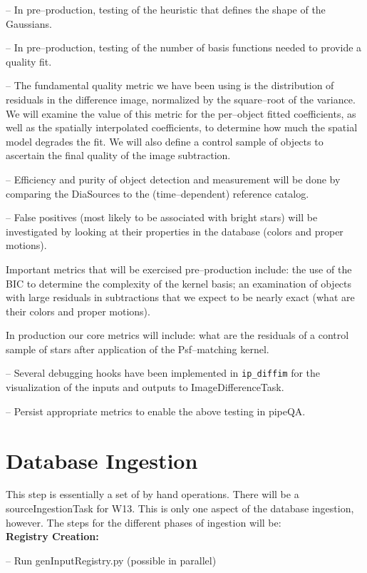 \documentclass[12pt]{article}
\begin{document}
-- In pre--production, testing of the heuristic that defines the shape
of the Gaussians.

-- In pre--production, testing of the number of basis functions needed
to provide a quality fit.  

-- The fundamental quality metric we have been using is the
distribution of residuals in the difference image, normalized by the
square--root of the variance.  We will examine the value of this
metric for the per--object fitted coefficients, as well as the
spatially interpolated coefficients, to determine how much the spatial
model degrades the fit.  We will also define a control sample of
objects to ascertain the final quality of the image subtraction.

-- Efficiency and purity of object detection and measurement will be
done by comparing the DiaSources to the (time--dependent) reference
catalog.

-- False positives (most likely to be associated with bright stars)
will be investigated by looking at their properties in the database
(colors and proper motions).

Important metrics that will be exercised pre--production include: the
use of the BIC to determine the complexity of the kernel basis; an
examination of objects with large residuals in subtractions that we
expect to be nearly exact (what are their colors and proper motions).

In production our core metrics will include: what are the residuals of
a control sample of stars after application of the Psf--matching
kernel.

-- Several debugging hooks have been implemented in {\tt ip\_diffim} for
the visualization of the inputs and outputs to ImageDifferenceTask.

-- Persist appropriate metrics to enable the above testing in pipeQA.


\clearpage 
\section{Database Ingestion} 
This step is essentially a set of by hand operations.  
There will be a sourceIngestionTask for W13.  This is only one aspect of the
database ingestion, however.  The steps for the different phases of ingestion will be:\\
{\bf Registry Creation:}

-- Run genInputRegistry.py (possible in parallel)
\end{document}
